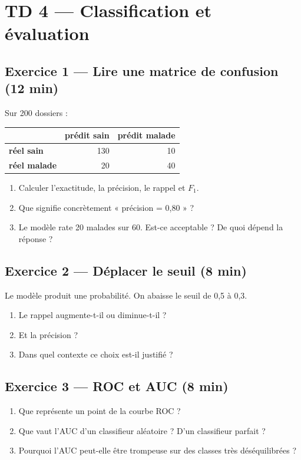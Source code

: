\section*{TD 4 --- Classification et évaluation}

\subsection*{Exercice 1 --- Lire une matrice de confusion \hfill \normalfont\footnotesize (12 min)}
Sur 200 dossiers :

\begin{center}
\small
\begin{tabular}{@{}lrr@{}}
\toprule
& \textbf{prédit sain} & \textbf{prédit malade} \\
\midrule
\textbf{réel sain} & 130 & 10 \\
\textbf{réel malade} & 20 & 40 \\
\bottomrule
\end{tabular}
\end{center}

\begin{enumerate}
  \item Calculer l'exactitude, la précision, le rappel et $F_1$.
  \item Que signifie concrètement « précision = 0,80 » ?
  \item Le modèle rate 20 malades sur 60. Est-ce acceptable ? De quoi dépend la
        réponse ?
\end{enumerate}

\subsection*{Exercice 2 --- Déplacer le seuil \hfill \normalfont\footnotesize (8 min)}
Le modèle produit une probabilité. On abaisse le seuil de 0,5 à 0,3.
\begin{enumerate}
  \item Le rappel augmente-t-il ou diminue-t-il ?
  \item Et la précision ?
  \item Dans quel contexte ce choix est-il justifié ?
\end{enumerate}

\subsection*{Exercice 3 --- ROC et AUC \hfill \normalfont\footnotesize (8 min)}
\begin{enumerate}
  \item Que représente un point de la courbe ROC ?
  \item Que vaut l'AUC d'un classifieur aléatoire ? D'un classifieur parfait ?
  \item Pourquoi l'AUC peut-elle être trompeuse sur des classes très
        déséquilibrées ?
\end{enumerate}

